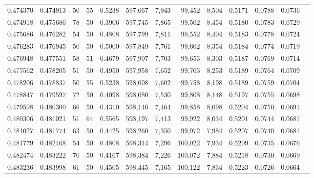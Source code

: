 \begin{tabular}{rrrrrrrrrrrrr}
0.474370 & 0.474913 &    50 &  55 &                                     0.5238 & 597,667 &   7,943 &  99,452 &   8,504 & 0.5171 & 0.0788 & 0.0736 \\
0.474918 & 0.475686 &    78 &  50 &                                     0.3906 & 597,745 &   7,865 &  99,502 &   8,454 & 0.5180 & 0.0783 & 0.0729 \\
0.475686 & 0.476282 &    54 &  50 &                                     0.4808 & 597,799 &   7,811 &  99,552 &   8,404 & 0.5183 & 0.0778 & 0.0724 \\
0.476283 & 0.476945 &    50 &  50 &                                     0.5000 & 597,849 &   7,761 &  99,602 &   8,354 & 0.5184 & 0.0774 & 0.0719 \\
0.476948 & 0.477551 &    58 &  51 &                                     0.4679 & 597,907 &   7,703 &  99,653 &   8,303 & 0.5187 & 0.0769 & 0.0714 \\
0.477562 & 0.478205 &    51 &  50 &                                     0.4950 & 597,958 &   7,652 &  99,703 &   8,253 & 0.5189 & 0.0764 & 0.0709 \\
0.478206 & 0.478837 &    50 &  55 &                                     0.5238 & 598,008 &   7,602 &  99,758 &   8,198 & 0.5189 & 0.0759 & 0.0704 \\
0.478847 & 0.479597 &    72 &  50 &                                     0.4098 & 598,080 &   7,530 &  99,808 &   8,148 & 0.5197 & 0.0755 & 0.0698 \\
0.479598 & 0.480300 &    66 &  50 &                                     0.4310 & 598,146 &   7,464 &  99,858 &   8,098 & 0.5204 & 0.0750 & 0.0691 \\
0.480306 & 0.481021 &    51 &  64 &                                     0.5565 & 598,197 &   7,413 &  99,922 &   8,034 & 0.5201 & 0.0744 & 0.0687 \\
0.481027 & 0.481774 &    63 &  50 &                                     0.4425 & 598,260 &   7,350 &  99,972 &   7,984 & 0.5207 & 0.0740 & 0.0681 \\
0.481779 & 0.482468 &    54 &  50 &                                     0.4808 & 598,314 &   7,296 & 100,022 &   7,934 & 0.5209 & 0.0735 & 0.0676 \\
0.482474 & 0.483222 &    70 &  50 &                                     0.4167 & 598,384 &   7,226 & 100,072 &   7,884 & 0.5218 & 0.0730 & 0.0669 \\
0.483236 & 0.483998 &    61 &  50 &                                     0.4505 & 598,445 &   7,165 & 100,122 &   7,834 & 0.5223 & 0.0726 & 0.0664 \\

\end{tabular}

